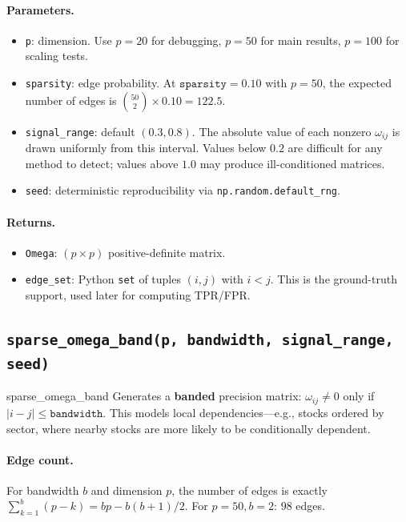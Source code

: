 \documentclass[11pt,a4paper]{article}
\begin{document}
\paragraph{Parameters.}
\begin{itemize}[nosep]
  \item \texttt{p}: dimension. Use $p=20$ for debugging, $p=50$ for main results, $p=100$ for scaling tests.
  \item \texttt{sparsity}: edge probability. At $\texttt{sparsity}=0.10$ with $p=50$, the expected number of edges is $\binom{50}{2} \times 0.10 = 122.5$.
  \item \texttt{signal\_range}: default $(0.3, 0.8)$. The absolute value of each nonzero $\omega_{ij}$ is drawn uniformly from this interval. Values below $0.2$ are difficult for any method to detect; values above $1.0$ may produce ill-conditioned matrices.
  \item \texttt{seed}: deterministic reproducibility via \texttt{np.random.default\_rng}.
\end{itemize}

\paragraph{Returns.}
\begin{itemize}[nosep]
  \item \texttt{Omega}: $(p \times p)$ positive-definite matrix.
  \item \texttt{edge\_set}: Python \texttt{set} of tuples $(i,j)$ with $i < j$. This is the ground-truth support, used later for computing TPR/FPR.
\end{itemize}

\subsection{\texttt{sparse\_omega\_band(p, bandwidth, signal\_range, seed)}}

\begin{funccard}{sparse\_omega\_band}
Generates a \textbf{banded} precision matrix: $\omega_{ij} \neq 0$ only if $|i - j| \le \texttt{bandwidth}$. This models local dependencies---e.g., stocks ordered by sector, where nearby stocks are more likely to be conditionally dependent.
\end{funccard}

\paragraph{Edge count.} For bandwidth $b$ and dimension $p$, the number of edges is exactly $\sum_{k=1}^{b}(p-k) = bp - b(b+1)/2$. For $p=50, b=2$: $98$ edges.
\end{document}
